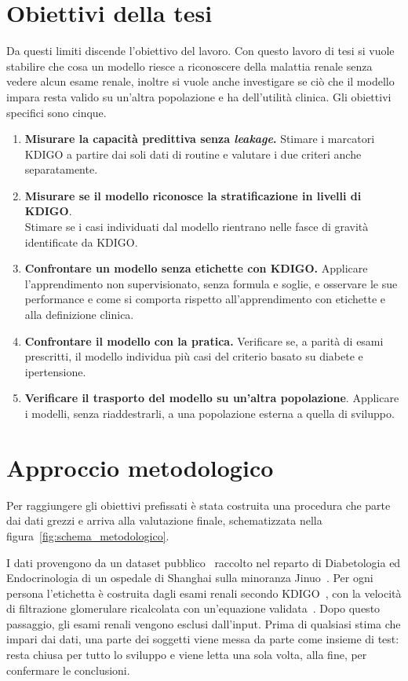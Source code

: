 \documentclass[a4paper, 12pt, oneside]{book}
\begin{document}
\section{Obiettivi della tesi}
Da questi limiti discende l'obiettivo del lavoro. Con questo lavoro di tesi si vuole stabilire che cosa un modello riesce a riconoscere della malattia renale senza vedere alcun esame renale, inoltre si vuole anche investigare se ciò che il modello impara resta valido su un'altra popolazione e ha dell'utilità clinica. Gli obiettivi specifici sono cinque.
\begin{enumerate}
	\item \textbf{Misurare la capacità predittiva senza \textit{leakage}.} Stimare i marcatori KDIGO a partire dai soli dati di routine e valutare i due criteri anche separatamente.
	\item \textbf{Misurare se il modello riconosce la stratificazione in livelli di KDIGO}.\\
	 Stimare se i casi individuati dal modello rientrano nelle fasce di gravità identificate da KDIGO.
	\item \textbf{Confrontare un modello senza etichette con KDIGO.} Applicare l'apprendimento non supervisionato, senza formula e soglie, e osservare le sue performance e come si comporta rispetto all'apprendimento con etichette e alla definizione clinica.
	\item \textbf{Confrontare il modello con la pratica.} Verificare se, a parità di esami prescritti, il modello individua più casi del criterio basato su diabete e  ipertensione.
	\item \textbf{Verificare il trasporto del modello su un'altra popolazione}. Applicare i modelli, senza riaddestrarli, a una popolazione esterna a quella di sviluppo.
\end{enumerate}

\section{Approccio metodologico}
Per raggiungere gli obiettivi prefissati è stata costruita una procedura che parte dai dati grezzi e arriva alla valutazione finale, schematizzata nella figura~\ref{fig:schema_metodologico}.

I dati provengono da un dataset pubblico~\cite{li_bimodal_2026} raccolto nel reparto di Diabetologia ed Endocrinologia di un ospedale di Shanghai sulla minoranza Jinuo~\cite{jiang_jinuo_2016}. Per ogni persona l'etichetta è costruita dagli esami renali secondo KDIGO~\cite{stevens_kdigo_2024}, con la velocità di filtrazione glomerulare ricalcolata con un'equazione validata~\cite{inker_new_2021}. Dopo questo passaggio, gli esami renali vengono esclusi dall'input. Prima di qualsiasi stima che impari dai dati, una parte dei soggetti viene messa da parte come insieme di test: resta chiusa per tutto lo sviluppo e viene letta una sola volta, alla fine, per confermare le conclusioni.
\end{document}
